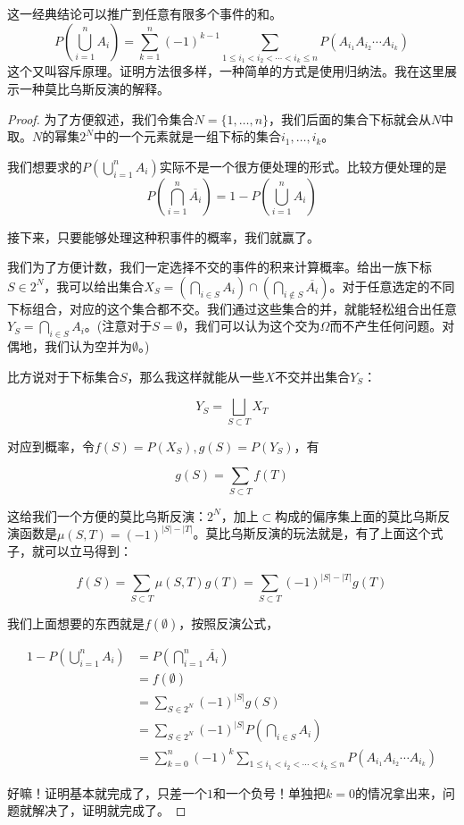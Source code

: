 这一经典结论可以推广到任意有限多个事件的和。
\[
P(\bigcup_{i=1}^n A_i) = \sum_{k=1}^{n}(-1)^{k-1}\sum_{1\leq i_1<i_2<\cdots<i_k\leq n}P(A_{i_1}A_{i_2}\cdots A_{i_k})
\]
这个又叫容斥原理。证明方法很多样，一种简单的方式是使用归纳法。我在这里展示一种莫比乌斯反演的解释。
\begin{proof}
为了方便叙述，我们令集合$N=\{1,\ldots,n\}$，我们后面的集合下标就会从$N$中取。$N$的幂集$2^N$中的一个元素就是一组下标的集合${i_1,\ldots,i_k}$。

我们想要求的$P(\bigcup_{i=1}^n A_i)$实际不是一个很方便处理的形式。比较方便处理的是
\[
P(\bigcap_{i=1}^n \overline{A_i}) = 1 - P(\bigcup_{i=1}^n A_i)
\]

接下来，只要能够处理这种积事件的概率，我们就赢了。

我们为了方便计数，我们一定选择不交的事件的积来计算概率。给出一族下标$S\in 2^N$，我可以给出集合$X_S=(\bigcap_{i\in S}A_i)\cap(\bigcap_{i\notin S}\overline{A_i})$。对于任意选定的不同下标组合，对应的这个集合都不交。我们通过这些集合的并，就能轻松组合出任意$Y_S=\bigcap_{i\in S} A_i$。(注意对于$S=\emptyset$，我们可以认为这个交为$\Omega$而不产生任何问题。对偶地，我们认为空并为$\emptyset$。)

比方说对于下标集合$S$，那么我这样就能从一些$X$不交并出集合$Y_S$：

\[
Y_S=\bigsqcup_{S\subset T} X_T
\]

对应到概率，令$f(S)=P(X_S),g(S)=P(Y_S)$，有

\[
g(S) = \sum_{S\subset T}f(T)
\]

这给我们一个方便的莫比乌斯反演：$2^N$，加上$\subset$构成的偏序集上面的莫比乌斯反演函数是$\mu(S,T)=(-1)^{|S|-|T|}$。莫比乌斯反演的玩法就是，有了上面这个式子，就可以立马得到：

\[
f(S) = \sum_{S\subset T} \mu(S,T)g(T) = \sum_{S\subset T} (-1)^{|S|-|T|}g(T)
\]

我们上面想要的东西就是$f(\emptyset)$，按照反演公式，

\begin{align*}
1 - P(\bigcup_{i=1}^n A_i)&=P(\bigcap_{i=1}^n \overline{A_i})\\
&=f(\emptyset)\\
&= \sum_{S\in 2^N}(-1)^{|S|}g(S)\\
&= \sum_{S\in 2^N}(-1)^{|S|}P(\bigcap_{i\in S}A_i)\\
&= \sum_{k=0}^n(-1)^k\sum_{1\leq i_1 <i_2 <\cdots <i_k\leq n}P(A_{i_1}A_{i_2}\cdots A_{i_k})
\end{align*}

好嘛！证明基本就完成了，只差一个$1$和一个负号！单独把$k=0$的情况拿出来，问题就解决了，证明就完成了。

\end{proof}

